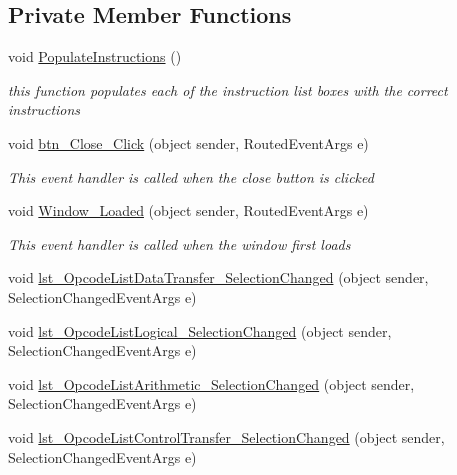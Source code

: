 \subsection*{Private Member Functions}
\begin{DoxyCompactItemize}
\item 
void \hyperlink{class_c_p_u___o_s___simulator_1_1_instructions_window_a52685f2ecc3d1cf7216716401d2621e0}{Populate\+Instructions} ()
\begin{DoxyCompactList}\small\item\em this function populates each of the instruction list boxes with the correct instructions \end{DoxyCompactList}\item 
void \hyperlink{class_c_p_u___o_s___simulator_1_1_instructions_window_a5fd3510dda95cf73b61af11ccacd81cd}{btn\+\_\+\+Close\+\_\+\+Click} (object sender, Routed\+Event\+Args e)
\begin{DoxyCompactList}\small\item\em This event handler is called when the close button is clicked \end{DoxyCompactList}\item 
void \hyperlink{class_c_p_u___o_s___simulator_1_1_instructions_window_a7d985ca63f2e27bc03a2198ec6879b49}{Window\+\_\+\+Loaded} (object sender, Routed\+Event\+Args e)
\begin{DoxyCompactList}\small\item\em This event handler is called when the window first loads \end{DoxyCompactList}\item 
void \hyperlink{class_c_p_u___o_s___simulator_1_1_instructions_window_a380aec4afa9900f7dd9ef964a5b86503}{lst\+\_\+\+Opcode\+List\+Data\+Transfer\+\_\+\+Selection\+Changed} (object sender, Selection\+Changed\+Event\+Args e)
\item 
void \hyperlink{class_c_p_u___o_s___simulator_1_1_instructions_window_a245baef3e788a01e6cf752f2c48f1843}{lst\+\_\+\+Opcode\+List\+Logical\+\_\+\+Selection\+Changed} (object sender, Selection\+Changed\+Event\+Args e)
\item 
void \hyperlink{class_c_p_u___o_s___simulator_1_1_instructions_window_ab4001352180ad08e3b335bf80c7dd9b8}{lst\+\_\+\+Opcode\+List\+Arithmetic\+\_\+\+Selection\+Changed} (object sender, Selection\+Changed\+Event\+Args e)
\item 
void \hyperlink{class_c_p_u___o_s___simulator_1_1_instructions_window_a1173e7310199c8312dabdf6905b53b73}{lst\+\_\+\+Opcode\+List\+Control\+Transfer\+\_\+\+Selection\+Changed} (object sender, Selection\+Changed\+Event\+Args e)

\end{DoxyCompactItemize}
